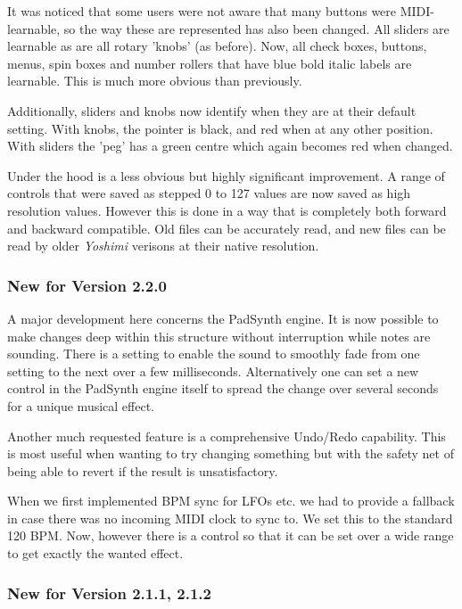 \documentclass[
 11pt,
 twoside,
 a4paper,
 final                                 %
]{article}
\begin{document}
It was noticed that some users were not aware that many buttons were MIDI-learnable, so the way these are represented has also been changed. All sliders are learnable as are all rotary 'knobs' (as before). Now, all check boxes, buttons, menus, spin boxes and number rollers that have blue bold italic labels are learnable. This is much more obvious than previously.

Additionally, sliders and knobs now identify when they are at their default setting. With knobs, the pointer is black, and red when at any other position. With sliders the 'peg' has a green centre which again becomes red when changed.

Under the hood is a less obvious but highly significant improvement. A range of controls that were saved as stepped 0 to 127 values are now saved as high resolution values. However this is done in a way that is completely both forward and backward compatible. Old files can be accurately read, and new files can be read by older \textsl{Yoshimi} verisons at their native resolution.

\subsubsection{New for Version 2.2.0}
\label{subsubsec:new_features_2_2_0}
   A major development here concerns the PadSynth engine. It is now
   possible to make changes deep within this structure without interruption
   while notes are sounding. There is a setting to enable the sound to
   smoothly fade from one setting to the next over a few milliseconds.
   Alternatively one can set a new control in the PadSynth engine itself to
   spread the change over several seconds for a unique musical effect.

   Another much requested feature is a comprehensive Undo/Redo capability.
   This is most useful when wanting to try changing something but with the
   safety net of being able to revert if the result is unsatisfactory.

   When we first implemented BPM sync for LFOs etc. we had to provide a
   fallback in case there was no incoming MIDI clock to sync to. We set
   this to the standard 120 BPM. Now, however there is a control so that it
   can be set over a wide range to get exactly the wanted effect.

\subsubsection{New for Version 2.1.1, 2.1.2}
\label{subsubsec:new_features_2_1_1}
\end{document}
